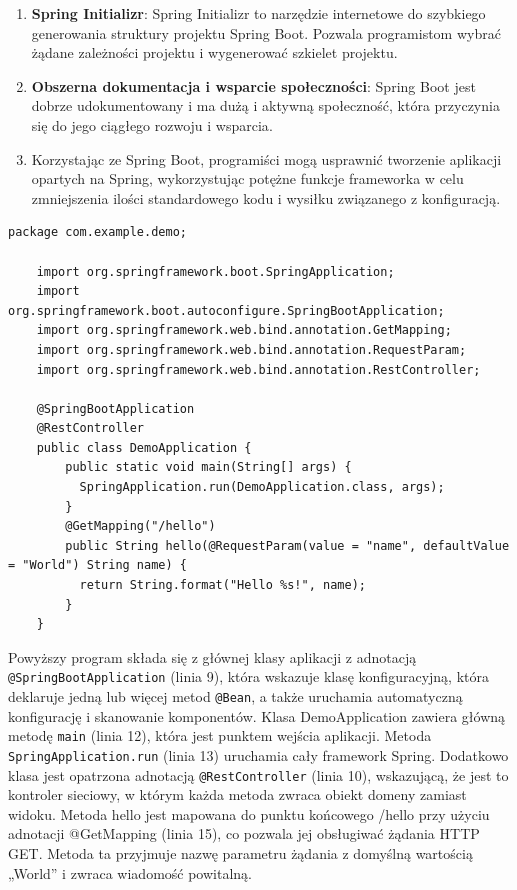 \begin{enumerate}
    \item \textbf{Spring Initializr}: Spring Initializr to narzędzie internetowe do szybkiego generowania struktury projektu Spring Boot. Pozwala programistom wybrać żądane zależności projektu i wygenerować szkielet projektu\cite{springbootFeatures}.
    \item \textbf{Obszerna dokumentacja i wsparcie społeczności}: Spring Boot jest dobrze udokumentowany i ma dużą i aktywną społeczność, która przyczynia się do jego ciągłego rozwoju i wsparcia\cite{springbootFeatures}.
    \item Korzystając ze Spring Boot, programiści mogą usprawnić tworzenie aplikacji opartych na Spring, wykorzystując potężne funkcje frameworka w celu zmniejszenia ilości standardowego kodu i wysiłku związanego z konfiguracją\cite{springbootFeatures}.
\end{enumerate}

\begin{lstlisting}[caption=Przykładowy podstawowy program , label=basicSpringBootClass]
    package com.example.demo;
    
    import org.springframework.boot.SpringApplication;
    import org.springframework.boot.autoconfigure.SpringBootApplication;
    import org.springframework.web.bind.annotation.GetMapping;
    import org.springframework.web.bind.annotation.RequestParam;
    import org.springframework.web.bind.annotation.RestController;
    
    @SpringBootApplication
    @RestController
    public class DemoApplication {
        public static void main(String[] args) {
          SpringApplication.run(DemoApplication.class, args);
        }
        @GetMapping("/hello")
        public String hello(@RequestParam(value = "name", defaultValue = "World") String name) {
          return String.format("Hello %s!", name);
        }
    }
\end{lstlisting}

Powyższy program składa się z głównej klasy aplikacji z adnotacją \verb|@SpringBootApplication| (linia 9), która wskazuje klasę konfiguracyjną, która deklaruje jedną lub więcej metod \verb|@Bean|, a także uruchamia automatyczną konfigurację i skanowanie komponentów. Klasa DemoApplication zawiera główną metodę \verb|main| (linia 12), która jest punktem wejścia aplikacji. Metoda \verb|SpringApplication.run| (linia 13) uruchamia cały framework Spring.
Dodatkowo klasa jest opatrzona adnotacją \verb|@RestController| (linia 10), wskazującą, że jest to kontroler sieciowy, w którym każda metoda zwraca obiekt domeny zamiast widoku. Metoda hello jest mapowana do punktu końcowego /hello przy użyciu adnotacji @GetMapping (linia 15), co pozwala jej obsługiwać żądania HTTP GET. Metoda ta przyjmuje nazwę parametru żądania z domyślną wartością „World” i zwraca wiadomość powitalną.

